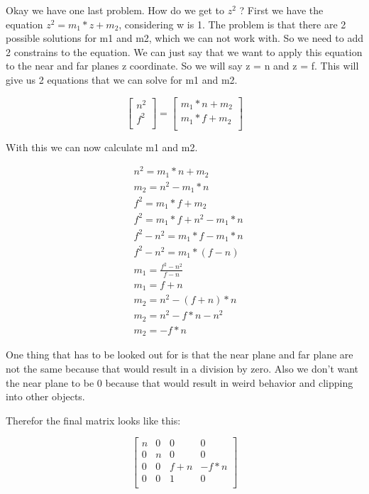 \documentclass[12pt]{report} \usepackage{preamble}
\begin{document}
Okay we have one last problem. How do we get to \(z^2\) ?
First we have the equation \(z^2 = m_1 * z + m_2\), considering w is 1.
The problem is that there are 2 possible solutions for m1 and m2, which we
can not work with. So we need to add 2 constrains to the equation.
We can just say that we want to apply this equation to the near and far planes z coordinate.
So we will say z = n and z = f. This will give us 2 equations that we can solve for m1 and m2.

\[
	\begin{bmatrix}
		n^2 \\
		f^2 \\
	\end{bmatrix}
	=
	\begin{bmatrix}
		m_1 * n + m_2 \\
		m_1 * f + m_2 \\
	\end{bmatrix}
\]

With this we can now calculate m1 and m2.

\[
	\begin{aligned}
		 & n^2 = m_1 * n + m_2           \\
		 & m_2 = n^2 - m_1 * n           \\
		 & f^2 = m_1 * f + m_2           \\
		 & f^2 = m_1 * f + n^2 - m_1 * n \\
		 & f^2 - n^2 = m_1 * f - m_1 * n \\
		 & f^2 - n^2 = m_1 * (f - n)     \\
		 & m_1 = \frac{f^2 - n^2}{f - n} \\
		 & m_1 = f + n                   \\
		 & m_2 = n^2 - (f + n) * n       \\
		 & m_2 = n^2 - f * n - n^2       \\
		 & m_2 = -f * n
	\end{aligned}
\]

One thing that has to be looked out for is that the near plane and far plane
are not the same because that would result in a division by zero. Also we don't
want the near plane to be 0 because that would result in weird behavior and clipping
into other objects.

Therefor the final matrix looks like this:

\[
	\begin{bmatrix}
		n & 0 & 0     & 0      \\
		0 & n & 0     & 0      \\
		0 & 0 & f + n & -f * n \\
		0 & 0 & 1     & 0      \\
	\end{bmatrix}
\]
\end{document}

